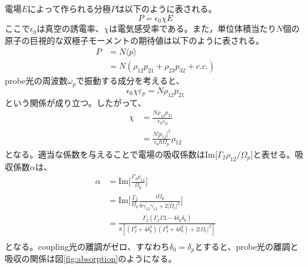 \documentclass[dvipdfmx]{jsreport}
\begin{document}
電場$E$によって作られる分極$P$は以下のように表される。
\begin{equation}
    P = \epsilon_0 \chi E
\end{equation}
ここで$\epsilon_0$は真空の誘電率、$\chi$は電気感受率である。また，単位体積当たり$N$個の原子の巨視的な双極子モーメントの期待値は以下のように表される。
\begin{equation}
\begin{split}
    P &= N\langle p \rangle \\
    &= N(\rho_{12}p_{21} + \rho_{23}p_{32} + c.c.)
\end{split}
\end{equation}
probe光の周波数$\omega_p$で振動する成分を考えると、
\begin{equation}
     \epsilon_0 \chi \varepsilon_p = N\rho_{12}p_{21} 
\end{equation}
という関係が成り立つ。したがって、
\begin{equation}
\begin{split}
    \chi &=  \frac{N\rho_{12}p_{21}}{\epsilon_0 \varepsilon_p} \\
    &= \frac{N |p_{12}|^2}{\epsilon_0 \hbar \Omega_p}\rho_{12}
\end{split}
\end{equation}
となる。適当な係数を与えることで電場の吸収係数は$\text{Im}\lbrack \Gamma_2 \rho_{12} /\Omega_p \rbrack$と表せる。吸収係数$\alpha$は、
\begin{equation}
\begin{split}
\label{eit-absorption}
    \alpha &=  \text{Im} \lbrack \frac{\Gamma_2 \rho_{12}}{\Omega_p} \rbrack \\
    &= \text{Im} \lbrack \frac{\Gamma_2}{\Omega_p} \frac{i\Omega_p}{8\gamma_{12}^{'}\gamma_{13}^{'} + 2|\Omega_c|^2} \rbrack \\
    &= \frac{\Gamma_2 \left( \Gamma_2\Gamma3 - 4\delta_p\delta_0 \right)}{8\left[ (\Gamma_2^2 + 4\delta_p^2)(\Gamma_3^2 + 4\delta_0^2) + 2|\Omega_c|^2 \right]} \\
\end{split}
\end{equation}
となる。coupling光の離調がゼロ、すなわち$\delta_0 = \delta_p$とすると、probe光の離調と吸収の関係は図\ref{fig:absorption}のようになる。
\end{document}
